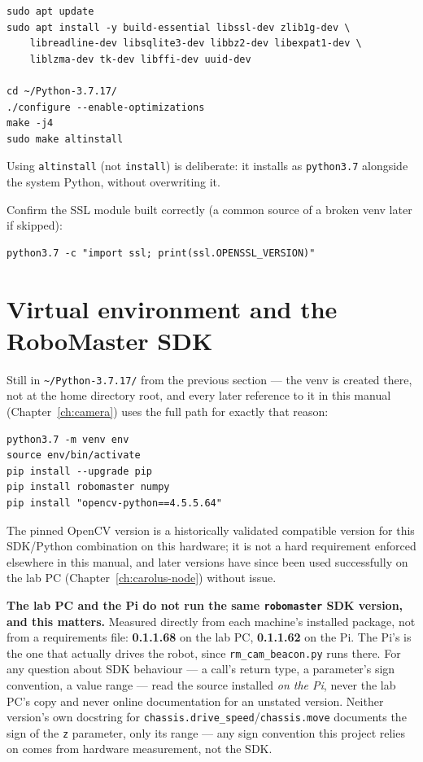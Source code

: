 \documentclass[11pt]{report}
\newenvironment{warningbox}%
  {\begin{lrbox}{\warnbox}\begin{minipage}{0.90\textwidth}}%
  {\end{minipage}\end{lrbox}%
   \begin{center}\fcolorbox{black}{codebg}{\usebox{\warnbox}}\end{center}}
\begin{document}
\begin{lstlisting}[style=shell]
sudo apt update
sudo apt install -y build-essential libssl-dev zlib1g-dev \
    libreadline-dev libsqlite3-dev libbz2-dev libexpat1-dev \
    liblzma-dev tk-dev libffi-dev uuid-dev

cd ~/Python-3.7.17/
./configure --enable-optimizations
make -j4
sudo make altinstall
\end{lstlisting}

Using \texttt{altinstall} (not \texttt{install}) is deliberate: it installs
as \texttt{python3.7} alongside the system Python, without overwriting it.

Confirm the SSL module built correctly (a common source of a broken venv
later if skipped):

\begin{lstlisting}[style=shell]
python3.7 -c "import ssl; print(ssl.OPENSSL_VERSION)"
\end{lstlisting}

\section{Virtual environment and the RoboMaster SDK}

Still in \texttt{\textasciitilde/Python-3.7.17/} from the previous section
--- the venv is created there, not at the home directory root, and every
later reference to it in this manual (Chapter~\ref{ch:camera}) uses the
full path for exactly that reason:

\begin{lstlisting}[style=shell]
python3.7 -m venv env
source env/bin/activate
pip install --upgrade pip
pip install robomaster numpy
pip install "opencv-python==4.5.5.64"
\end{lstlisting}

The pinned OpenCV version is a historically validated compatible version for
this SDK/Python combination on this hardware; it is not a hard requirement
enforced elsewhere in this manual, and later versions have since been used
successfully on the lab PC (Chapter~\ref{ch:carolus-node}) without issue.

\begin{warningbox}
\textbf{The lab PC and the Pi do not run the same \texttt{robomaster} SDK
version, and this matters.} Measured directly from each machine's installed
package, not from a requirements file: \textbf{0.1.1.68} on the lab PC,
\textbf{0.1.1.62} on the Pi. The Pi's is the one that actually drives the
robot, since \texttt{rm\_cam\_beacon.py} runs there. For any question about
SDK behaviour --- a call's return type, a parameter's sign convention, a
value range --- read the source installed \emph{on the Pi}, never the lab
PC's copy and never online documentation for an unstated version. Neither
version's own docstring for \texttt{chassis.drive\_speed}/\texttt{chassis.move}
documents the sign of the \texttt{z} parameter, only its range --- any sign
convention this project relies on comes from hardware measurement, not the
SDK.
\end{warningbox}
\end{document}
